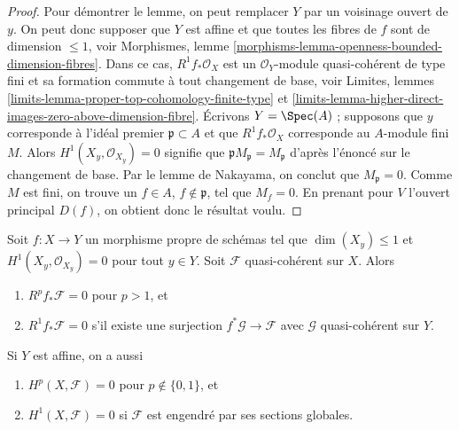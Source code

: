 \begin{proof}
Pour démontrer le lemme, on peut remplacer $Y$ par un voisinage ouvert de $y$.
On peut donc supposer que $Y$ est affine et que toutes les fibres de $f$ sont de
dimension $\leq 1$, voir
Morphismes, lemme \ref{morphisms-lemma-openness-bounded-dimension-fibres}.
Dans ce cas, $R^1f_*\mathcal{O}_X$ est un $\mathcal{O}_Y$-module quasi-cohérent
de type fini et sa formation commute à tout changement de base, voir
Limites, lemmes \ref{limits-lemma-proper-top-cohomology-finite-type} et
\ref{limits-lemma-higher-direct-images-zero-above-dimension-fibre}.
Écrivons $Y = \Spec(A)$ ; supposons que $y$ corresponde à l'idéal premier $\mathfrak p \subset A$ et que
$R^1f_*\mathcal{O}_X$ corresponde au $A$-module fini $M$.
Alors $H^1(X_y, \mathcal{O}_{X_y}) = 0$ signifie que
$\mathfrak pM_\mathfrak p = M_\mathfrak p$ d'après l'énoncé
sur le changement de base. Par le lemme de Nakayama,
on conclut que $M_\mathfrak p = 0$. Comme $M$ est fini, on trouve
un $f \in A$, $f \not \in \mathfrak p$, tel que $M_f = 0$.
En prenant pour $V$ l'ouvert principal $D(f)$, on obtient donc le résultat voulu.
\end{proof}

\begin{lemma}
\label{lemma-globally-generated-vanishing}
Soit $f : X \to Y$ un morphisme propre de schémas tel
que $\dim(X_y) \leq 1$ et $H^1(X_y, \mathcal{O}_{X_y}) = 0$
pour tout $y \in Y$. Soit $\mathcal{F}$ quasi-cohérent sur $X$. Alors
\begin{enumerate}
\item $R^pf_*\mathcal{F} = 0$ pour $p > 1$, et
\item $R^1f_*\mathcal{F} = 0$ s'il existe une surjection
$f^*\mathcal{G} \to \mathcal{F}$ avec $\mathcal{G}$ quasi-cohérent
sur $Y$.
\end{enumerate}
Si $Y$ est affine, on a aussi
\begin{enumerate}
\item[(3)] $H^p(X, \mathcal{F}) = 0$ pour $p \not \in \{0, 1\}$, et
\item[(4)] $H^1(X, \mathcal{F}) = 0$ si $\mathcal{F}$ est engendré par ses sections globales.
\end{enumerate}
\end{lemma}


